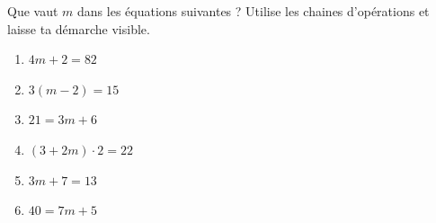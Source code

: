 %
%
	Que vaut \(m\) dans les équations suivantes ? Utilise les chaines d’opérations et laisse ta démarche visible.
	\begin{enumerate}[cols=3]
		\item \(4m+2=82\)
		\item \(3(m-2)=15\)
		\item \(21=3m+6\)
		\item \((3+2m)\cdot 2=22\)
		\item \(3m + 7 = 13\)
		\item \(40=7m + 5\)
	\end{enumerate}
